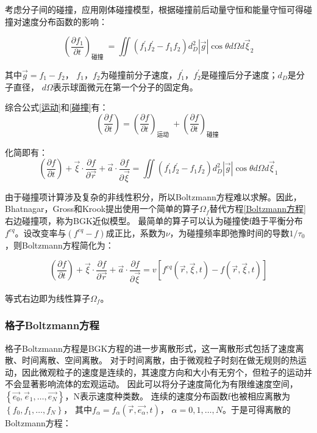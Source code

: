 \noindent 考虑分子间的碰撞，应用刚体碰撞模型，根据碰撞前后动量守恒和能量守恒可得碰撞对速度分布函数的影响：

\begin{equation}
\label{碰撞}
\left(\frac{\partial f_{1}}{\partial t}\right)_{\text {碰撞 }}=\iint\left(f_{1}^{\prime} f_{2}^{\prime}-f_{1} f_{2}\right) d_{D}^{2}|\vec{g}| \cos \theta d \Omega d \vec{\xi}_{2}\end{equation}

\noindent  其中$\vec{g} =  f_{1} - f_{2}$， $f_{1}$，$f_{2}$为碰撞前分子速度，$f_{1}^{\prime}$，$f_{2}^{\prime}$是碰撞后分子速度；$d_{D}$是分子直径，
$d \Omega$表示球面微元在第一个分子的固定角。

综合公式\ref{运动}和\ref{碰撞}有：
\begin{equation}\left(\frac{\partial f}{\partial t}\right)=\left(\frac{\partial f}{\partial t}\right)_{\text {运动 }}+\left(\frac{\partial f}{\partial t}\right)_{\text {碰撞 }}\end{equation}

\noindent 化简即有：
\begin{equation}
\label{Boltzmann方程}
\left(\frac{\partial f}{\partial t}\right)+\vec{\xi} \cdot \frac{\partial f}{\partial \vec{r}}+\vec{a} \cdot \frac{\partial f}{\partial \vec{\xi}}=\iint\left(f_{1}^{\prime} f_{2}^{\prime}-f_{1} f_{2}\right) d_{D}^{2}|\vec{g}| \cos \theta d \Omega d \vec{\xi}_{1}\end{equation}

由于碰撞项计算涉及复杂的非线性积分，所以Boltzmann方程难以求解。因此，Bhatnagar，Gross和Krook提出使用一个简单的算子$\Omega_{f}$替代方程\ref{Boltzmann方程}右边碰撞项，称为BGK近似模型。
最简单的算子可以认为碰撞使f趋于平衡分布$f^{e q}$。设改变率与$\left(f^{e q}-f\right)$成正比，系数为$\nu$，为碰撞频率即弛豫时间的导数${1}/{\tau_{0}}$，则Boltzmann方程简化为：

\begin{equation}\left(\frac{\partial f}{\partial t}\right)+\vec{\xi} \cdot \frac{\partial f}{\partial \vec{r}}+\vec{a} \cdot \frac{\partial f}{\partial \vec{\xi}}=v\left[f^{e q}(\vec{r}, \vec{\xi}, t)-f(\vec{r}, \vec{\xi}, t)\right]\end{equation}

\noindent 等式右边即为线性算子$\Omega_{f}$。

\subsubsection{格子Boltzmann方程}
格子Boltzmann方程是BGK方程的进一步离散形式，这一离散形式包括了速度离散、时间离散、空间离散。
对于时间离散，由于微观粒子时刻在做无规则的热运动，因此微观粒子的速度是连续的，其速度方向和大小有无穷个，但粒子的运动并不会显著影响流体的宏观运动。
因此可以将分子速度简化为有限维速度空间，$\left\{\overrightarrow{e_{0}}, \vec{e}_{1}, \ldots, \overrightarrow{e_{N}}\right\}$，N表示速度种类数。
连续的速度分布函数f也被相应离散为$\left\{f_{0}, f_{1}, \ldots, f_{N}\right\}$，
其中$f_{\alpha}=f_{\alpha}\left(\vec{r}, \overrightarrow{e_{\alpha}}, t\right)$，
$\alpha=0,1, \ldots, N$。于是可得离散的Boltzmann方程：

